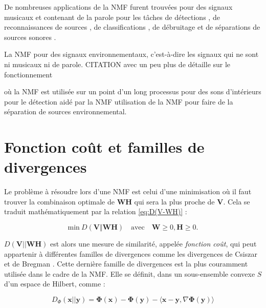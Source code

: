De nombreuses applications de la NMF furent trouvées pour des signaux musicaux et contenant de la parole pour les tâches de détections \cite{dessein2013real}, de reconnaissances de sources \cite{gemmeke2013exemplar}, de classifications \cite{benetos2006musical}, de débruitage \cite{wilson_speech_2008} et de séparations de sources sonores \cite{virtanen_monaural_2007}.

La NMF pour des signaux environnementaux, c'est-à-dire les signaux qui ne sont ni musicaux ni de parole.
 CITATION avec un peu plus de détaille sur le fonctionnement

\cite{ghoraani2011time} où la NMF est utilisée sur un point d'un long processus
\cite{gemmeke2013exemplar} pour des sons d'intérieurs
\cite{mesaros_sound_2015} pour le détection aidé par la NMF
\cite{satoshi_innami_nmf-based_2012} utilisation de la NMF pour faire de la séparation de sources environnemental.

\section{Fonction coût et familles de divergences}

Le problème à résoudre lors d'une NMF est celui d'une minimisation où il faut trouver la combinaison optimale de $\mathbf{WH}$ qui sera la plus proche de $\mathbf{V}$. Cela se traduit mathématiquement par la relation \ref{eq:D(V-WH)} :

\begin{equation}\label{eq:D(V-WH)}
\text{min}~D\left(\textbf{V} \Vert \textbf{WH}\right) \quad \text{avec} \quad \mathbf{W} \geq 0, \mathbf{H} \geq 0.
\end{equation}

$D\left(\textbf{V} \vert\vert \textbf{WH}\right)$ est alors une mesure de similarité, appelée \textit{fonction coût}, qui peut appartenir à différentes familles de divergences comme les divergences de Csiszar \cite{cichocki2006csiszar} et de Bregman \cite{bregman_relaxation_1967, dhillon_generalized_2005}. Cette dernière famille de divergences est la plus couramment utilisée dans le cadre de la NMF. Elle se définit, dans un sous-ensemble convexe $S$ d'un espace de Hilbert, comme :

\begin{equation}\label{eq:Bregdiv}
D_{\Phi}(\textbf{x}\vert\vert \textbf{y}) =
\mathbf{\Phi}(\mathbf{x}) - \mathbf{\Phi}(\mathbf{y}) -
\langle\mathbf{x}-\mathbf{y},\nabla\mathbf{\Phi}(\mathbf{y})\rangle
\end{equation}

